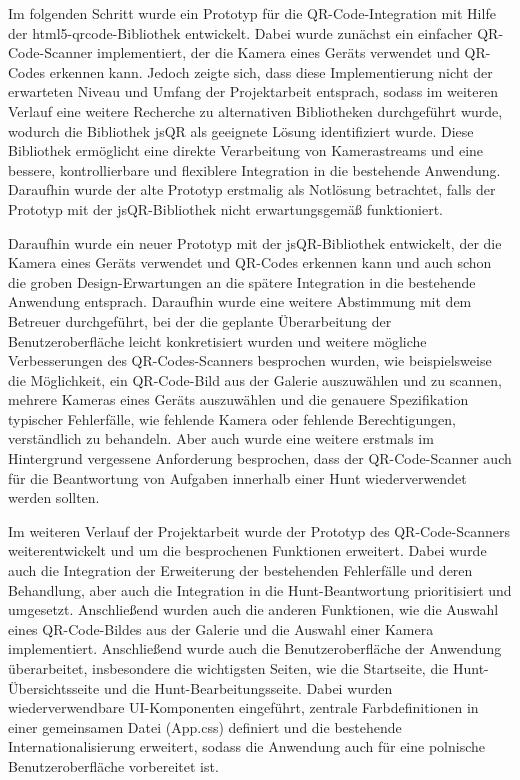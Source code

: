 ﻿\documentclass[oneside]{ausarbeitung}
\begin{document}
Im folgenden Schritt wurde ein Prototyp für die QR-Code-Integration mit Hilfe der html5-qrcode-Bibliothek entwickelt. Dabei wurde zunächst ein einfacher
QR-Code-Scanner implementiert, der die Kamera eines Geräts verwendet und QR-Codes erkennen kann. Jedoch zeigte sich, dass diese Implementierung nicht
der erwarteten Niveau und Umfang der Projektarbeit entsprach, sodass im weiteren Verlauf eine weitere Recherche zu alternativen Bibliotheken 
durchgeführt wurde, wodurch die Bibliothek jsQR als geeignete Lösung identifiziert wurde. Diese Bibliothek ermöglicht eine direkte Verarbeitung von 
Kamerastreams und eine bessere, kontrollierbare und flexiblere Integration in die bestehende Anwendung. Daraufhin wurde der alte Prototyp erstmalig als
Notlösung betrachtet, falls der Prototyp mit der jsQR-Bibliothek nicht erwartungsgemäß funktioniert. 

Daraufhin wurde ein neuer Prototyp mit der jsQR-Bibliothek entwickelt, der die Kamera eines Geräts verwendet und QR-Codes erkennen kann und auch schon 
die groben Design-Erwartungen an die spätere Integration in die bestehende Anwendung entsprach. Daraufhin wurde eine weitere Abstimmung mit dem 
Betreuer durchgeführt, bei der die geplante Überarbeitung der Benutzeroberfläche leicht konkretisiert wurden und weitere mögliche Verbesserungen des 
QR-Codes-Scanners besprochen wurden, wie beispielsweise die Möglichkeit, ein QR-Code-Bild aus der Galerie auszuwählen und zu scannen, mehrere Kameras 
eines Geräts auszuwählen und die genauere Spezifikation typischer Fehlerfälle, wie fehlende Kamera oder fehlende Berechtigungen, verständlich zu 
behandeln. Aber auch wurde eine weitere erstmals im Hintergrund vergessene Anforderung besprochen, dass der QR-Code-Scanner auch für die Beantwortung 
von Aufgaben innerhalb einer Hunt wiederverwendet werden sollten.

Im weiteren Verlauf der Projektarbeit wurde der Prototyp des QR-Code-Scanners weiterentwickelt und um die besprochenen Funktionen erweitert. Dabei wurde 
auch die Integration der Erweiterung der bestehenden Fehlerfälle und deren Behandlung, aber auch die Integration in die Hunt-Beantwortung prioritisiert 
und umgesetzt. Anschließend wurden auch die anderen Funktionen, wie die Auswahl eines QR-Code-Bildes aus der Galerie und die Auswahl einer Kamera 
implementiert. Anschließend wurde auch die Benutzeroberfläche der Anwendung überarbeitet, insbesondere die wichtigsten Seiten, wie die Startseite, 
die Hunt-Übersichtsseite und die Hunt-Bearbeitungsseite. Dabei wurden wiederverwendbare UI-Komponenten eingeführt, zentrale Farbdefinitionen in einer 
gemeinsamen Datei (App.css) definiert und die bestehende Internationalisierung erweitert, sodass die Anwendung auch für eine polnische 
Benutzeroberfläche vorbereitet ist.
\end{document}
